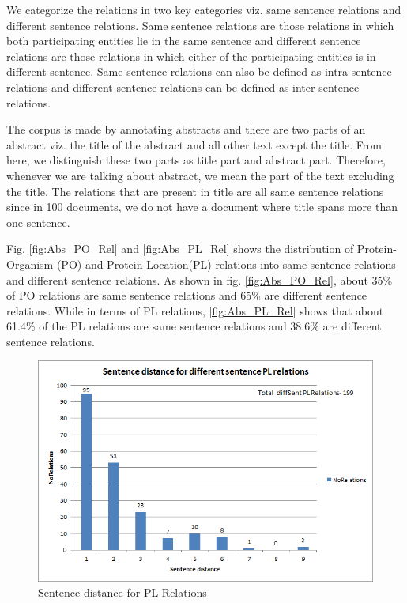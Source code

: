 We categorize the relations in two key categories viz. same sentence relations and  different sentence relations. Same sentence relations are those relations in which both participating entities lie in the same sentence and different sentence relations are those relations in which either of the participating entities is in different sentence. Same sentence relations can also be defined as intra sentence relations and different sentence relations can be defined as inter sentence relations.

The corpus is made by annotating abstracts and there are two parts of an abstract viz. the title of the abstract and all other text except the title. From here, we distinguish these two parts as title part and abstract part. Therefore, whenever we are talking about abstract, we mean the part of the text excluding the title. The relations that are present in title are all same sentence relations since in 100 documents, we do not have a document where title spans more than one sentence.

Fig. \ref{fig:Abs_PO_Rel} and \ref{fig:Abs_PL_Rel} shows the distribution of Protein-Organism (PO) and Protein-Location(PL) relations into same sentence relations and different sentence relations. As shown in fig. \ref{fig:Abs_PO_Rel}, about 35\% of PO relations are same sentence relations and 65\% are different sentence relations. While in terms of PL relations, \ref{fig:Abs_PL_Rel} shows that about 61.4\% of the PL relations are same sentence relations and 38.6\% are different sentence relations.

\begin{figure}
\centering
\includegraphics[scale=0.7]{figures/SentenceDistance_PLRel.png}
\caption{Sentence distance for PL Relations}\label{fig:SentDistancePL}
\end{figure}

